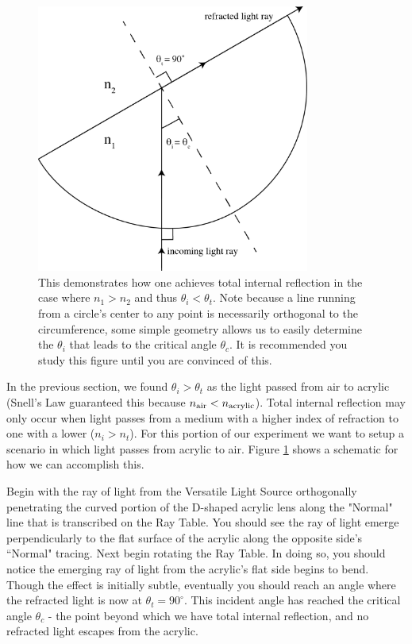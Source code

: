 \begin{figure}[h]
\centering
\includegraphics[width=0.8\textwidth]{./Exp6/pic/tirdiagram.png}
\caption{This demonstrates how one achieves total internal reflection in the case where $n_{1}>n_{2}$ and thus $\theta_{i}<\theta_{t}$.  Note because a line running from a circle's center to any point is necessarily orthogonal to the circumference, some simple geometry allows us to easily determine the $\theta_{i}$ that leads to the critical angle $\theta_{c}$.  It is recommended you study this figure until you are convinced of this.}
\label{fig:tirdiagram}
\end{figure} 

In the previous section, we found $\theta_{i} > \theta_{t}$ as the light passed from air to acrylic (Snell's Law guaranteed this because $n_{\rm air} < n_{\rm acrylic}$).  Total internal reflection may only occur when light passes from a medium with a higher index of refraction to one with a lower ($n_{i} > n_{t}$).  For this portion of our experiment we want to setup a scenario in which light passes from acrylic to air.  Figure \ref{fig:tirdiagram} shows a schematic for how we can accomplish this.\myskip

Begin with the ray of light from the Versatile Light Source orthogonally penetrating the curved portion of the D-shaped acrylic lens along the "Normal" line that is transcribed on the Ray Table.  You should see the ray of light emerge perpendicularly to the flat surface of the acrylic along the opposite side's ``Normal" tracing.  Next begin rotating the Ray Table.  In doing so, you should notice the emerging ray of light from the acrylic's flat side begins to bend.  Though the effect is initially subtle, eventually you should reach an angle where the refracted light is now at $\theta_{t}=90^{\circ}$.  This incident angle has reached the critical angle $\theta_{c}$ - the point beyond which we have total internal reflection, and no refracted light escapes from the acrylic.

